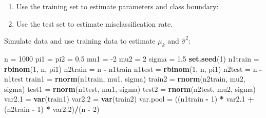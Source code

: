 \documentclass[10pt,ignorenonframetext,]{beamer}
\newenvironment{Shaded}{\begin{snugshade}}{\end{snugshade}}
\newcommand{\KeywordTok}[1]{\textcolor[rgb]{0.13,0.29,0.53}{\textbf{#1}}}
\newcommand{\DecValTok}[1]{\textcolor[rgb]{0.00,0.00,0.81}{#1}}
\newcommand{\FloatTok}[1]{\textcolor[rgb]{0.00,0.00,0.81}{#1}}
\newcommand{\StringTok}[1]{\textcolor[rgb]{0.31,0.60,0.02}{#1}}
\newcommand{\OperatorTok}[1]{\textcolor[rgb]{0.81,0.36,0.00}{\textbf{#1}}}
\newcommand{\NormalTok}[1]{#1}
\providecommand{\tightlist}{%
  \setlength{\itemsep}{0pt}\setlength{\parskip}{0pt}}
\begin{document}
\begin{frame}[fragile]

\begin{enumerate}
\def\labelenumi{\arabic{enumi}.}
\tightlist
\item
  Use the training set to estimate parameters and class boundary:
\item
  Use the test set to estimate misclassification rate.
\end{enumerate}

Simulate data and use training data to estimate \(\mu_k\) and
\(\hat\sigma^2\):

\footnotesize

\begin{Shaded}
\begin{Highlighting}[]
\NormalTok{n =}\StringTok{ }\DecValTok{1000}
\NormalTok{pi1 =}\StringTok{ }\NormalTok{pi2 =}\StringTok{ }\FloatTok{0.5}
\NormalTok{mu1 =}\StringTok{ }\DecValTok{-2}
\NormalTok{mu2 =}\StringTok{ }\DecValTok{2}
\NormalTok{sigma =}\StringTok{ }\FloatTok{1.5}
\KeywordTok{set.seed}\NormalTok{(}\DecValTok{1}\NormalTok{)}
\NormalTok{n1train =}\StringTok{ }\KeywordTok{rbinom}\NormalTok{(}\DecValTok{1}\NormalTok{, n, pi1)}
\NormalTok{n2train =}\StringTok{ }\NormalTok{n }\OperatorTok{-}\StringTok{ }\NormalTok{n1train}
\NormalTok{n1test =}\StringTok{ }\KeywordTok{rbinom}\NormalTok{(}\DecValTok{1}\NormalTok{, n, pi1)}
\NormalTok{n2test =}\StringTok{ }\NormalTok{n }\OperatorTok{-}\StringTok{ }\NormalTok{n1test}
\NormalTok{train1 =}\StringTok{ }\KeywordTok{rnorm}\NormalTok{(n1train, mu1, sigma)}
\NormalTok{train2 =}\StringTok{ }\KeywordTok{rnorm}\NormalTok{(n2train, mu2, sigma)}
\NormalTok{test1 =}\StringTok{ }\KeywordTok{rnorm}\NormalTok{(n1test, mu1, sigma)}
\NormalTok{test2 =}\StringTok{ }\KeywordTok{rnorm}\NormalTok{(n2test, mu2, sigma)}
\NormalTok{var2}\FloatTok{.1}\NormalTok{ =}\StringTok{ }\KeywordTok{var}\NormalTok{(train1)}
\NormalTok{var2}\FloatTok{.2}\NormalTok{ =}\StringTok{ }\KeywordTok{var}\NormalTok{(train2)}
\NormalTok{var.pool =}\StringTok{ }\NormalTok{((n1train }\OperatorTok{-}\StringTok{ }\DecValTok{1}\NormalTok{) }\OperatorTok{*}\StringTok{ }\NormalTok{var2}\FloatTok{.1} \OperatorTok{+}\StringTok{ }\NormalTok{(n2train }\OperatorTok{-}\StringTok{ }\DecValTok{1}\NormalTok{) }\OperatorTok{*}\StringTok{ }\NormalTok{var2}\FloatTok{.2}\NormalTok{)}\OperatorTok{/}\NormalTok{(n }\OperatorTok{-}\StringTok{ }\DecValTok{2}\NormalTok{)}
\end{Highlighting}
\end{Shaded}

\end{frame}
\end{document}
